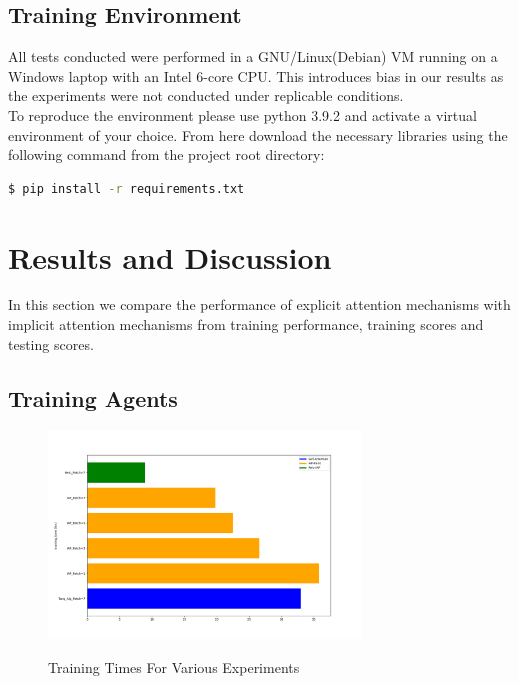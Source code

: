 \documentclass[10pt,twocolumn,letterpaper]{article}
\begin{document}
\subsection{Training Environment}
All tests conducted were performed in a GNU/Linux(Debian) VM running on a Windows laptop 
with an Intel 6-core CPU.
This introduces bias in our results as the experiments were not
conducted under replicable conditions.\\
To reproduce the environment please use python 3.9.2 and activate a virtual environment
of your choice. From here download the necessary libraries using the following command 
from the project root directory:
\begin{lstlisting}[language=bash]
  $ pip install -r requirements.txt
\end{lstlisting}

\section{Results and Discussion}

In this section we compare the performance of explicit attention mechanisms with 
implicit attention mechanisms from training performance, training scores
and testing scores.

\subsection{Training Agents}

\begin{figure}[h]
    \caption{Training Times For Various Experiments}
    \includegraphics[width=83mm, scale=0.9]{images/training_plot.png}
    \label{fig:train}
\end{figure}
\end{document}
